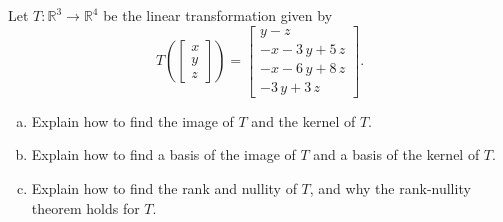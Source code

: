 
\begin{exerciseStatement}
 Let \(T:\mathbb{R}^ 3  \to \mathbb{R}^ 4 \) be the linear transformation given by \[T\left(  \left[\begin{array}{c}
x \\
y \\
z
\end{array}\right]  \right) =  \left[\begin{array}{c}
y - z \\
-x - 3 \, y + 5 \, z \\
-x - 6 \, y + 8 \, z \\
-3 \, y + 3 \, z
\end{array}\right] .\]
\begin{enumerate}[(a)]
\item Explain how to find the image of \(T\) and the kernel of \(T\).
\item Explain how to find a basis of the image of \(T\) and a basis of the kernel of \(T\).
\item Explain how to find the rank and nullity of \(T\), and why the rank-nullity theorem holds for \(T\).
\end{enumerate}
    
\end{exerciseStatement}
    
